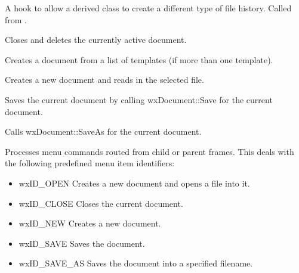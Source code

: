 

A hook to allow a derived class to create a different type of file history. Called
from .



Closes and deletes the currently active document.



Creates a document from a list of templates (if more than one template).



Creates a new document and reads in the selected file.



Saves the current document by calling wxDocument::Save for the current document.



Calls wxDocument::SaveAs for the current document.



Processes menu commands routed from child or parent frames. This deals
with the following predefined menu item identifiers:

\begin{itemize}\itemsep=0pt
\item wxID\_OPEN Creates a new document and opens a file into it.
\item wxID\_CLOSE Closes the current document.
\item wxID\_NEW Creates a new document.
\item wxID\_SAVE Saves the document.
\item wxID\_SAVE\_AS Saves the document into a specified filename.
\end{itemize}

